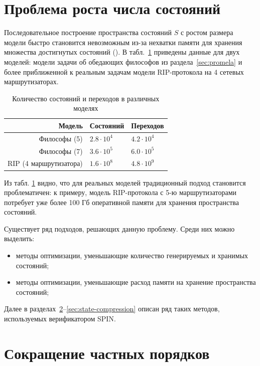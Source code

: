\section{Проблема роста числа состояний}
\label{sec:state-explosion}

Последовательное построение пространства состояний $S$ с ростом размера модели быстро
становится невозможным из-за нехватки памяти для хранения множества достигнутых состояний
(). В табл.~\ref{tab:models-statecount} приведены данные для двух моделей:
модели задачи об обедающих философов из раздела~\ref{sec:promela} и более приближенной к
реальным задачам модели RIP-протокола на 4 сетевых маршрутизаторах.

\begin{table}
  \centering
  \begin{tabular}{|r|l|l|}
    \hline
    Модель                  & Состояний         & Переходов       \\
    \hline
    Философы (5)            & $2.8 \cdot 10^4$  & $4.2 \cdot 10^4$ \\
    Философы (7)            & $3.6 \cdot 10^5$  & $6.0 \cdot 10^5$ \\
    RIP (4 маршрутизатора)  & $1.6 \cdot 10^8$  & $4.8 \cdot 10^9$ \\
    \hline
  \end{tabular}
  \caption{Количество состояний и переходов в различных моделях}
\label{tab:models-statecount}
\end{table}

Из табл. \ref{tab:models-statecount} видно, что для реальных моделей традиционный подход
становится проблематичен: к примеру, модель RIP-протокола с 5-ю маршрутизаторами потребует
уже более 100 Гб оперативной памяти для хранения пространства состояний.

Существует ряд подходов, решающих данную проблему. Среди них можно выделить:

\begin{itemize}
\item методы оптимизации, уменьшающие количество генерируемых и хранимых состояний;
\item методы оптимизации, уменьшающие расход памяти на хранение пространства состояний;
\end{itemize}

Далее в разделах~\ref{sec:partial-order-reduction}--\ref{sec:state-compression} описан ряд
таких методов, используемых верификатором SPIN.

\section{Сокращение частных порядков}
\label{sec:partial-order-reduction}

